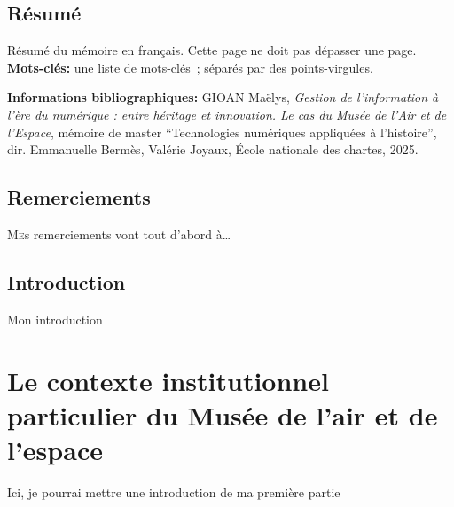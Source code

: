 \documentclass[12pt,twoside]{book}
\begin{document}
	\chapter{Résumé}
\medskip
	Résumé du mémoire en français. Cette page ne doit pas dépasser une page.\\
	
	\textbf{Mots-clés:} une liste de mots-clés~; séparés par des points-virgules.
	
	\textbf{Informations bibliographiques:} GIOAN Maëlys, \textit{Gestion de l’information à l’ère du numérique : entre héritage et innovation. Le cas du Musée de l’Air et de l’Espace}, mémoire de master \enquote{Technologies numériques appliquées à l'histoire}, dir. Emmanuelle Bermès, Valérie Joyaux, École nationale des chartes, 2025.
	
		\newpage{\pagestyle{empty}\cleardoublepage}
	
	\chapter{Remerciements}
	
\lettrine{M}es remerciements vont tout d'abord à\dots
	\newpage{\pagestyle{empty}\cleardoublepage}
	
\printbibliography

	
\chapter{Introduction}	
Mon introduction 

\newpage{\pagestyle{empty}\cleardoublepage}

	\mainmatter

	

	\part{Le contexte institutionnel particulier du Musée de l'air et de l'espace}


Ici, je pourrai mettre une introduction de ma première partie
\end{document}

